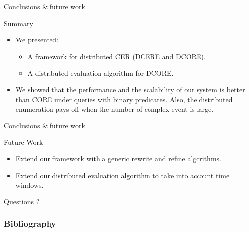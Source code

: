 \documentclass[xcolor=pdftex,dvipsnames,table]{beamer}
\begin{document}
\begin{frame}{Conclusions \& future work}
  \begin{block}{Summary}
   \begin{itemize}
     \item We presented:
        \begin{itemize}
          \item A framework for distributed CER (DCERE and DCORE).
          \pause
          \item A distributed evaluation algorithm for DCORE.
        \end{itemize}
     \pause
     \item We showed that the performance and the scalability of our system is better than CORE under queries with binary predicates. Also, the distributed enumeration pays off when the number of complex event is large.
   \end{itemize}
  \end{block}
\end{frame}


\begin{frame}{Conclusions \& future work}
  \begin{block}{Future Work}
   \begin{itemize}
     \item Extend our framework with a generic rewrite and refine algorithms.
     \pause
     \item Extend our distributed evaluation algorithm to take into account time windows.
   \end{itemize}
  \end{block}
\end{frame}


\begin{frame}[c]{ }
  \centering
  \huge Questions ?
\end{frame}


\begin{frame}[allowframebreaks]
  \frametitle{Bibliography}
  
  
\end{frame}
\end{document}
